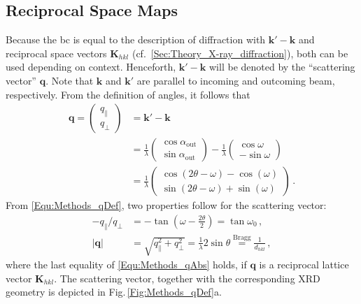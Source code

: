 \subsection{Reciprocal Space Maps}
    \label{Sec:Methods_RSM}
Because the \gls{bc} is equal to the description of diffraction with $\mathbf{k}'-\mathbf{k}$ and reciprocal space vectors $\mathbf{K}_{hkl}$ (cf.~\ref{Sec:Theory_X-ray_diffraction}), both can be used depending on context.
Henceforth, $\mathbf{k}'-\mathbf{k}$ will be denoted by the \enquote{scattering vector} $\mathbf{q}$.
Note that $\mathbf{k}$ and $\mathbf{k}'$ are parallel to incoming and outcoming beam, respectively.
From the definition of angles, it follows that
\begin{align}
    \mathbf{q}
    =\begin{pmatrix}
        q_\parallel\\
        q_\perp
    \end{pmatrix}
    &=\mathbf{k}'-\mathbf{k}\\
    &=\frac{1}{\lambda}
    \begin{pmatrix}
        \cos\alpha_\mathrm{out}\\
        \sin\alpha_\mathrm{out}
    \end{pmatrix}
    -\frac{1}{\lambda}
    \begin{pmatrix}
        \cos\omega\\
        -\sin\omega
    \end{pmatrix}\\
    &=\frac{1}{\lambda}
    \begin{pmatrix}
        \cos(2\theta-\omega)-\cos(\omega)\\
        \sin(2\theta-\omega)+\sin(\omega)
    \end{pmatrix}\,.
    \label{Equ:Methods_qDef}
\end{align}
From \eqref{Equ:Methods_qDef}, two properties follow for the scattering vector:
\begin{align}
    -q_\parallel/q_\perp&=-\tan\left(\omega-\frac{2\theta}{2}\right)=\tan\omega_0
        \label{Equ:Methods_qDir}\,,\\
    \left|\mathbf{q}\right|&=\sqrt{q_\parallel^2+q_\perp^2}=\frac{1}{\lambda}2\sin\theta\overset{\mathrm{Bragg}}{=}\frac{1}{d_{hkl}}\,,
    \label{Equ:Methods_qAbs}
\end{align}
where the last equality of \eqref{Equ:Methods_qAbs} holds, if $\mathbf{q}$ is a reciprocal lattice vector $\mathbf{K}_{hkl}$.
The scattering vector, together with the corresponding \gls{XRD} geometry is depicted in Fig.\,\ref{Fig:Methods_qDef}a.
